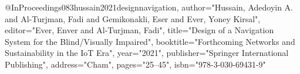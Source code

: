 @InProceedings{083hussain2021designnavigation,
author="Hussain, Adedoyin A.
and Al-Turjman, Fadi
and Gemikonakli, Eser
and Ever, Yoney Kirsal",
editor="Ever, Enver
and Al-Turjman, Fadi",
title="Design of a Navigation System for the Blind/Visually Impaired",
booktitle="Forthcoming Networks and Sustainability in the IoT Era",
year="2021",
publisher="Springer International Publishing",
address="Cham",
pages="25--45",
isbn="978-3-030-69431-9"
}